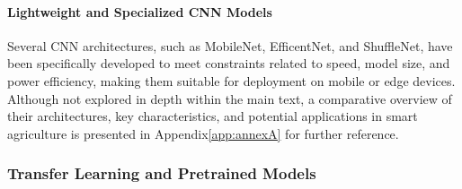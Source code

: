 

\paragraph{Lightweight and Specialized CNN Models}
Several CNN architectures, such as MobileNet, EfficentNet, and ShuffleNet, have been specifically developed to meet constraints related to speed, model size, and power efficiency, making them suitable for deployment on mobile or edge devices. Although not explored in depth within the main text, a comparative overview of their architectures, key characteristics, and potential applications in smart agriculture is presented in Appendix\ref{app:annexA} for further reference.


\subsubsection{Transfer Learning and Pretrained Models}


